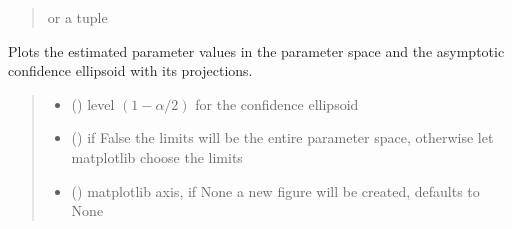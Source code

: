 \documentclass[letterpaper,10pt,english]{sphinxmanual}
\begin{document}
\begin{fulllineitems}
\begin{fulllineitems}
\begin{quote}
\begin{description}
\begin{itemize}
\end{itemize}

\sphinxAtStartPar
{} or a tuple 

\end{description}\end{quote}

\end{fulllineitems}


\begin{fulllineitems}
\label{\detokenize{cubmods:cubmods.cubsh.CUBresCUBSH.plot3d}}
\pysigstartsignatures
{}
\pysigstopsignatures
\sphinxAtStartPar
Plots the estimated parameter values in the parameter space and
the asymptotic confidence ellipsoid with its projections.
\begin{quote}\begin{description}
\begin{itemize}
\item {} 
\sphinxAtStartPar
{} () \textendash{} level \((1-\alpha/2)\) for the confidence ellipsoid

\item {} 
\sphinxAtStartPar
{} () \textendash{} if False the limits will be the entire parameter space, otherwise let matplotlib choose the limits

\item {} 
\sphinxAtStartPar
{} (\sphinxstyleliteralemphasis{\sphinxupquote{, }}) \textendash{} matplotlib axis, if None a new figure will be created, defaults to None

\end{itemize}

\end{description}\end{quote}


\end{fulllineitems}
\end{fulllineitems}
\end{document}
